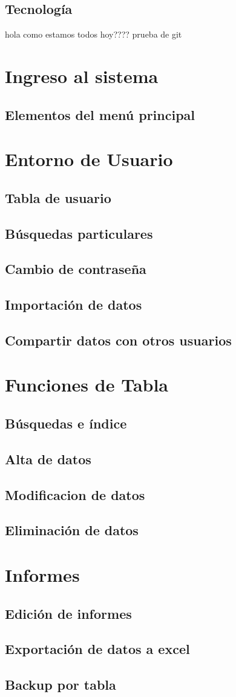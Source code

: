 \documentclass[a4paper,10pt]{article}
\begin{document}
\subsection{Tecnología}
hola como estamos todos hoy???? prueba de git
\section{Ingreso al sistema}
\subsection{Elementos del menú principal}


\section{Entorno de Usuario}
\subsection{Tabla de usuario}
\subsection{Búsquedas particulares}
\subsection{Cambio de contraseña}
\subsection{Importación de datos}
\subsection{Compartir datos con otros usuarios}


\section{Funciones de Tabla}
\subsection{Búsquedas e índice}
\subsection{Alta de datos}
\subsection{Modificacion de datos}
\subsection{Eliminación de datos}


\section{Informes}
\subsection{Edición de informes}
\subsection{Exportación de datos a excel}
\subsection{Backup por tabla}
\end{document}
